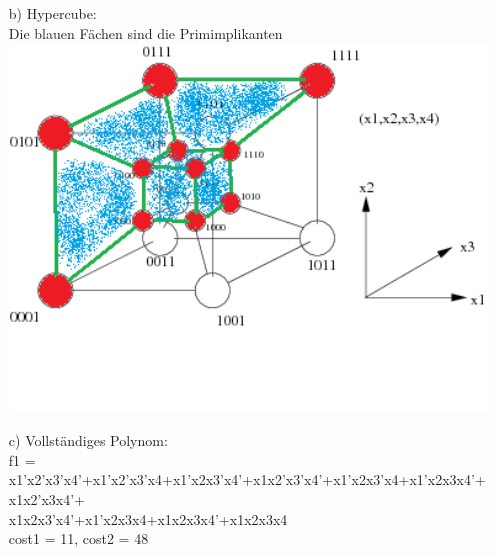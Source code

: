 \documentclass{scrartcl}
\begin{document}
\begin{itemize}
	 \item[b)] Hypercube:\\
	 Die blauen Fächen sind die Primimplikanten\\
	 \includegraphics[width=14cm]{hypercube.png}\\

         \item[c)]
             Vollständiges Polynom:\\
             f1 = x1'x2'x3'x4'+x1'x2'x3'x4+x1'x2x3'x4'+x1x2'x3'x4'+x1'x2x3'x4+x1'x2x3x4'+x1x2'x3x4'+\\
             x1x2x3'x4'+x1'x2x3x4+x1x2x3x4'+x1x2x3x4\\
             cost1 = 11, cost2 = 48\\
         \end{itemize}
\end{document}
